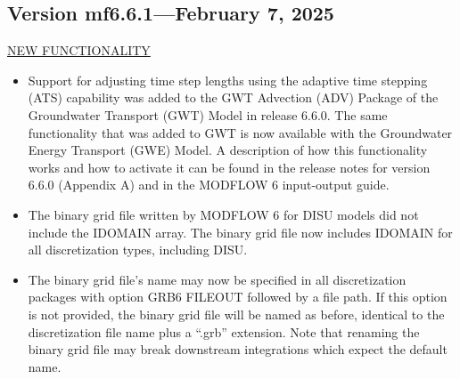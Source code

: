 	
\subsection{Version mf6.6.1---February 7, 2025}

\underline{NEW FUNCTIONALITY}
\begin{itemize}
	\item Support for adjusting time step lengths using the adaptive time stepping (ATS) capability was added to the GWT Advection (ADV) Package of the Groundwater Transport (GWT) Model in release 6.6.0.  The same functionality that was added to GWT is now available with the Groundwater Energy Transport (GWE) Model.  A description of how this functionality works and how to activate it can be found in the release notes for version 6.6.0 (Appendix A) and in the MODFLOW 6 input-output guide.
	\item The binary grid file written by MODFLOW 6 for DISU models did not include the IDOMAIN array.  The binary grid file now includes IDOMAIN for all discretization types, including DISU.
	\item The binary grid file's name may now be specified in all discretization packages with option GRB6 FILEOUT followed by a file path. If this option is not provided, the binary grid file will be named as before, identical to the discretization file name plus a ``.grb'' extension. Note that renaming the binary grid file may break downstream integrations which expect the default name.
\end{itemize}


